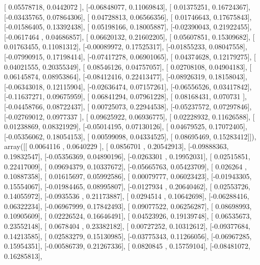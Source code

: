 \documentclass{article}
\begin{document}
       [ 0.05578718,  0.0442072 ],
       [-0.06848077,  0.11069843],
       [ 0.01375251,  0.16724367],
       [-0.03435765,  0.07864306],
       [ 0.04728813,  0.06566356],
       [ 0.01746643,  0.17675843],
       [-0.01586405,  0.13392438],
       [ 0.05198166,  0.18005887],
       [-0.02390043,  0.21922455],
       [-0.0617464 ,  0.04686857],
       [ 0.06620132,  0.21602205],
       [ 0.05607851,  0.15309682],
       [ 0.01763455,  0.11081312],
       [-0.00089972,  0.17525317],
       [-0.01855233,  0.08047558],
       [-0.07990915,  0.17198414],
       [-0.07417278,  0.06901065],
       [ 0.04374628,  0.12179275],
       [ 0.04021555,  0.20355349],
       [ 0.08546126,  0.04757057],
       [ 0.02708108,  0.04904183],
       [ 0.06145874,  0.08953864],
       [-0.08412416,  0.22413477],
       [-0.08926319,  0.18158043],
       [-0.06343018,  0.12115904],
       [-0.02636474,  0.07157261],
       [-0.06556526,  0.03417842],
       [-0.11637271,  0.09675959],
       [ 0.06841294,  0.07961228],
       [ 0.08168431,  0.070731  ],
       [-0.04458766,  0.08722437],
       [ 0.00725073,  0.22944538],
       [-0.05237572,  0.07297846],
       [-0.02769012,  0.0977337 ],
       [ 0.09625922,  0.06936775],
       [ 0.02228932,  0.11626588],
       [ 0.01238869,  0.08321929],
       [-0.05014195,  0.07130126],
       [ 0.04679525,  0.17072405],
       [-0.05356062,  0.18054153],
       [ 0.00599098,  0.04334525],
       [ 0.08695469,  0.15283412]]), array([[ 0.0064116 ,  0.0640229 ],
       [ 0.0856701 ,  0.20542913],
       [-0.09888363,  0.19832547],
       [-0.05356369,  0.04890196],
       [-0.0263301 ,  0.19952031],
       [ 0.02515851,  0.22417009],
       [ 0.09694379,  0.10337672],
       [-0.05665763,  0.05423709],
       [ 0.026264  ,  0.10887358],
       [ 0.01615697,  0.05992586],
       [ 0.00079777,  0.06023423],
       [-0.01943305,  0.15554067],
       [-0.01984465,  0.08995807],
       [-0.0127934 ,  0.20640462],
       [ 0.02553726,  0.14055972],
       [-0.0935536 ,  0.21173887],
       [ 0.0294514 ,  0.10642698],
       [-0.06288416,  0.06322234],
       [-0.06967999,  0.17842493],
       [ 0.09077522,  0.06256287],
       [ 0.08698993,  0.10905609],
       [ 0.02226524,  0.16646491],
       [ 0.04523926,  0.19139748],
       [ 0.06535673,  0.23552148],
       [ 0.0678404 ,  0.23382182],
       [ 0.00727252,  0.10312612],
       [-0.09377684,  0.14213585],
       [ 0.02583279,  0.15130985],
       [-0.03775343,  0.11266056],
       [-0.06967285,  0.15954351],
       [-0.00586739,  0.21267336],
       [ 0.0820845 ,  0.15759104],
       [-0.08481072,  0.16285813],
\end{document}

